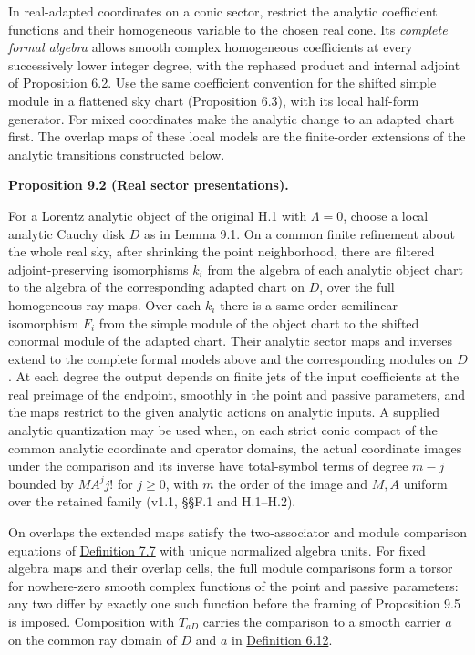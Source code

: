 \documentclass[
  english,
  11pt,
  reqno]{amsart}
\makeatletter
\newcommand{\pandocstatementheading}[1]{%
  \par\addpenalty{\@beginparpenalty}%
  \addvspace{.5\baselineskip plus .2\baselineskip minus .2\baselineskip}%
  {\normalfont\bfseries #1\par}%
  \nobreak\@afterindenttrue\@afterheading
}
\makeatother
\begin{document}
In real-adapted coordinates on a conic sector, restrict the analytic
coefficient functions and their homogeneous variable to the chosen real
cone. Its \emph{complete formal algebra} allows smooth complex
homogeneous coefficients at every successively lower integer degree,
with the rephased product and internal adjoint of Proposition 6.2. Use
the same coefficient convention for the shifted simple module in a
flattened sky chart (Proposition 6.3), with its local half-form
generator. For mixed coordinates make the analytic change to an adapted
chart first. The overlap maps of these local models are the finite-order
extensions of the analytic transitions constructed below.

\pandocstatementheading{\leavevmode{}\label{prop:analytic-real-sector-interface}Proposition 9.2 (Real sector presentations).}

For a Lorentz analytic object of the original H.1 with \(\Lambda=0\),
choose a local analytic Cauchy disk \(D\) as in Lemma 9.1. On a common
finite refinement about the whole real sky, after shrinking the point
neighborhood, there are filtered adjoint-preserving isomorphisms \(k_i\)
from the algebra of each analytic object chart to the algebra of the
corresponding adapted chart on \(D\), over the full homogeneous ray
maps. Over each \(k_i\) there is a same-order semilinear isomorphism
\(F_i\) from the simple module of the object chart to the shifted
conormal module of the adapted chart. Their analytic sector maps and
inverses extend to the complete formal models above and the
corresponding modules on \(D\). At each degree the output depends on
finite jets of the input coefficients at the real preimage of the
endpoint, smoothly in the point and passive parameters, and the maps
restrict to the given analytic actions on analytic inputs. A supplied
analytic quantization may be used when, on each strict conic compact of
the common analytic coordinate and operator domains, the actual
coordinate images under the comparison and its inverse have total-symbol
terms of degree \(m-j\) bounded by \(M A^j j!\) for \(j\ge0\), with
\(m\) the order of the image and \(M,A\) uniform over the retained
family (v1.1, §§F.1 and H.1--H.2).

On overlaps the extended maps satisfy the two-associator and module
comparison equations of
\hyperref[def:online-complete-independent-wave-source]{Definition 7.7}
with unique normalized algebra units. For fixed algebra maps and their
overlap cells, the full module comparisons form a torsor for
nowhere-zero smooth complex functions of the point and passive
parameters: any two differ by exactly one such function before the
framing of Proposition 9.5 is imposed. Composition with \(T_{aD}\)
carries the comparison to a smooth carrier \(a\) on the common ray
domain of \(D\) and \(a\) in
\hyperref[def:online-wave-carrier-displays]{Definition 6.12}.
\end{document}
